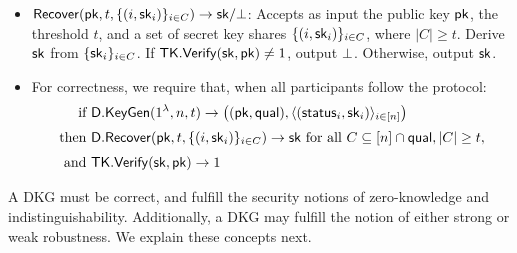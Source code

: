 \begin{definition}
\begin{itemize}
    \item $\mathsf{Recover}(\mathsf{pk}, t, \{ (i, \mathsf{sk}_i) \}_{i \in C}) \rightarrow \mathsf{sk}/\bot$:
      Accepts as input the public key $\mathsf{pk}$,
      the threshold $t$,
      and a set of secret key shares $\{(i,\mathsf{sk}_i) \}_{i \in C}$,
      where $\lvert C \rvert \geq t$.
      Derive $\mathsf{sk}$ from $\{\mathsf{sk}_i \}_{i \in C}$.
      If $\mathsf{TK}.\mathsf{Verify}(\mathsf{sk}, \mathsf{pk}) \neq 1$, output $\bot$.
      Otherwise, output $\mathsf{sk}$.
    \item For correctness, we require that, when all participants follow the protocol:
\begin{align*}
    \text{if } & \mathsf{D}.\mathsf{KeyGen}(1^\lambda, n, t) \rightarrow \left((\mathsf{pk}, \mathsf{qual}), \langle (\mathsf{status}_i, \mathsf{sk}_i)\rangle_{i \in [n]}\right) \\[1mm]
    \text{then } & \mathsf{D}.\mathsf{Recover}(\mathsf{pk}, t, \{(i,\mathsf{sk}_i)\}_{i \in C}) \rightarrow \mathsf{sk} \text{ for all }  C \subseteq [n] \cap \mathsf{qual}, \lvert C \rvert \geq t, \\[1mm]
    \text{and } &  \mathsf{TK}.\mathsf{Verify}(\mathsf{sk}, \mathsf{pk}) \rightarrow 1
 \end{align*}
\end{itemize}
\end{definition}

A DKG must be correct, and fulfill the security notions of
zero-knowledge and indistinguishability.
Additionally, a DKG may fulfill the notion of either strong or weak robustness.
We explain these concepts next.

